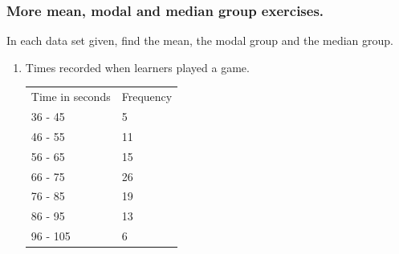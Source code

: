 \begin{description}[noitemsep]
\begin{description}[noitemsep]
            \subsubsection{  More mean, modal and median group exercises. }
            \nopagebreak
        \label{m39400*id215497}In each data set given, find the mean, the modal group and the median group.\par 
        \label{m39400*id215504}\begin{enumerate}[noitemsep, label=\textbf{\arabic*}. ] 
            \label{m39400*uid103}\item Times recorded when learners played a game.
          \begin{table}
        \begin{center}
      \label{m39400*id215519}
    \noindent
      \tablelasttail{}
      \begin{xtabular}[t]{|l|l|}\hline
        Time in seconds &
        Frequency%
     \tabularnewline{}
        36 - 45 &
        5%
     \tabularnewline{}
        46 - 55 &
        11%
     \tabularnewline{}
        56 - 65 &
        15%
     \tabularnewline{}
        66 - 75 &
        26%
     \tabularnewline{}
        76 - 85 &
        19%
     \tabularnewline{}
        86 - 95 &
        13%
     \tabularnewline{}
        96 - 105 &
        6%

\end{xtabular}
\end{center}
\end{table}
\end{enumerate}
\end{description}
\end{description}
